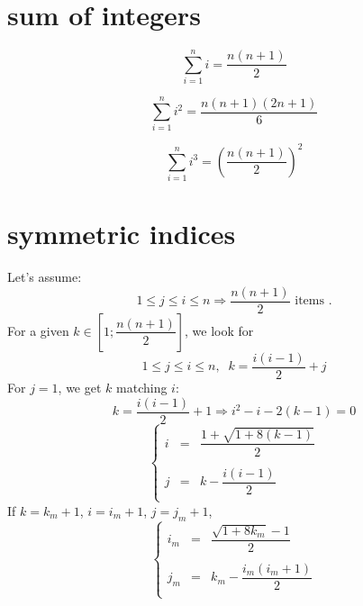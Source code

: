 \documentclass[aps,onecolumn,11pt]{revtex4}
\begin{document}
\section{sum of integers}
\begin{equation}
	\sum_{i=1}^n i = \dfrac{n(n+1)}{2}
\end{equation}

\begin{equation}
	\sum_{i=1}^n i^2 = \dfrac{n(n+1)(2n+1)}{6}
\end{equation}

\begin{equation}
	\sum_{i=1}^n i^3 = \left(\dfrac{n(n+1)}{2}\right)^2
\end{equation}

\section{symmetric indices}

Let's assume:
\begin{equation}
	1\leq j \leq i \leq n \Rightarrow \dfrac{n(n+1)}{2} \text{ items }.
\end{equation}
For a given $k\in \left[ 1;\dfrac{n(n+1)}{2}\right]$, we look for
\begin{equation}
	1\leq j \leq i \leq n, \;\; k = \frac{i(i-1)}{2}+j
\end{equation}
For $j=1$, we get $k$ matching $i$:
\begin{equation}
	k=\dfrac{i(i-1)}{2}+1 \Rightarrow i^2-i - 2(k-1) = 0
\end{equation}
\begin{equation}
\left\lbrace
	\begin{array}{rcl}
	i &=& \dfrac{1+\sqrt{1+8(k-1)}}{2}\\
	\\
	j &=& k-\dfrac{i(i-1)}{2}\\
	\end{array}
\right.
\end{equation}
If $k=k_m+1$, $i=i_m+1$, $j=j_m+1$,
\begin{equation}
	\left\lbrace
	\begin{array}{rcl}
	i_m &=& \dfrac{\sqrt{1+8k_m}-1}{2}\\
	\\
	j_m &=& k_m -\dfrac{i_m(i_m+1)}{2}\\
	\end{array}
\right.
\end{equation}
\end{document}

